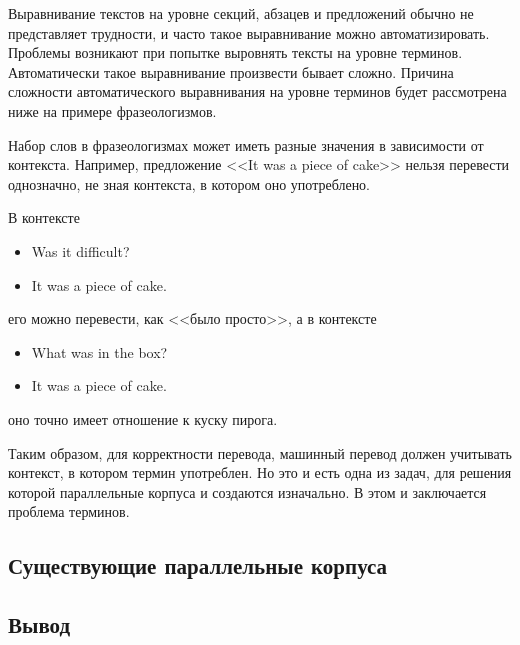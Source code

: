Выравнивание текстов на уровне секций, абзацев и предложений обычно не представляет трудности, и часто такое выравнивание можно автоматизировать.
Проблемы возникают при попытке выровнять тексты на уровне терминов.
Автоматически такое выравнивание произвести бывает сложно.
Причина сложности автоматического выравнивания на уровне терминов будет рассмотрена ниже на примере фразеологизмов.

Набор слов в фразеологизмах может иметь разные значения в зависимости от контекста.
Например, предложение <<It was a piece of cake>> нельзя перевести однозначно, не зная контекста, в котором оно употреблено.

В контексте 
\begin{itemize}
    \item Was it difficult?
    \item It was a piece of cake.
\end{itemize}
его можно перевести, как <<было просто>>, а в контексте
\begin{itemize}
    \item What was in the box?
    \item It was a piece of cake.
\end{itemize}
оно точно имеет отношение к куску пирога.

Таким образом, для корректности перевода, машинный перевод должен учитывать контекст, в котором термин употреблен.
Но это и есть одна из задач, для решения которой параллельные корпуса и создаются изначально.
В этом и заключается проблема терминов.




\subsection{Существующие параллельные корпуса}


\subsection{Вывод}
